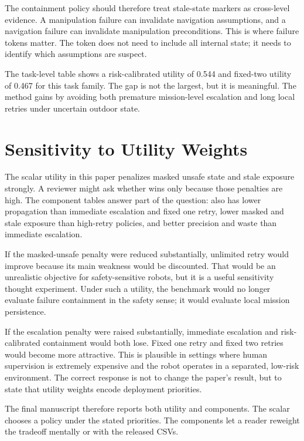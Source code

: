 The containment policy should therefore treat stale-state markers as cross-level evidence. A manipulation failure can invalidate navigation assumptions, and a navigation failure can invalidate manipulation preconditions. This is where failure tokens matter. The token does not need to include all internal state; it needs to identify which assumptions are suspect.

The task-level table shows a risk-calibrated utility of 0.544 and fixed-two utility of 0.467 for this task family. The gap is not the largest, but it is meaningful. The method gains by avoiding both premature mission-level escalation and long local retries under uncertain outdoor state.

\section{Sensitivity to Utility Weights}

The scalar utility in this paper penalizes masked unsafe state and stale exposure strongly. A reviewer might ask whether \method wins only because those penalties are high. The component tables answer part of the question: \method also has lower propagation than immediate escalation and fixed one retry, lower masked and stale exposure than high-retry policies, and better precision and waste than immediate escalation.

If the masked-unsafe penalty were reduced substantially, unlimited retry would improve because its main weakness would be discounted. That would be an unrealistic objective for safety-sensitive robots, but it is a useful sensitivity thought experiment. Under such a utility, the benchmark would no longer evaluate failure containment in the safety sense; it would evaluate local mission persistence.

If the escalation penalty were raised substantially, immediate escalation and risk-calibrated containment would both lose. Fixed one retry and fixed two retries would become more attractive. This is plausible in settings where human supervision is extremely expensive and the robot operates in a separated, low-risk environment. The correct response is not to change the paper's result, but to state that utility weights encode deployment priorities.

The final manuscript therefore reports both utility and components. The scalar chooses a policy under the stated priorities. The components let a reader reweight the tradeoff mentally or with the released CSVs.

